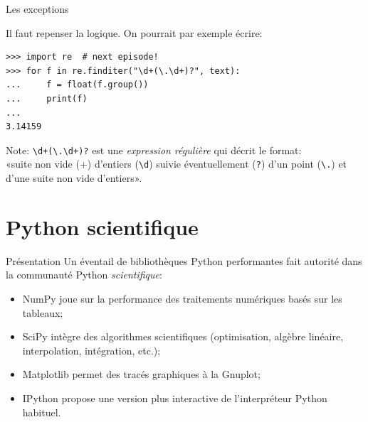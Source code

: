 \documentclass[dvipsnames]{beamer}
\begin{document}
\begin{frame} [fragile]{Les exceptions}

    Il faut repenser la logique. On pourrait par exemple écrire:

    \begin{verbatim}
>>> import re  # next episode!
>>> for f in re.finditer("\d+(\.\d+)?", text):
...     f = float(f.group())
...     print(f)
...
3.14159
\end{verbatim}
    {\footnotesize
    Note: \verb|\d+(\.\d+)?| est une \emph{expression régulière} qui décrit
    le format:\\ «suite non vide (+) d'entiers (\verb+\d+) suivie éventuellement
    (\verb+?+) d'un point (\verb+\.+) et d'une suite non vide d'entiers».
    }
\end{frame}

\section{Python scientifique}

\begin{frame}
    [fragile]{Présentation}
    Un éventail de bibliothèques Python performantes fait autorité dans la
    communauté Python \emph{scientifique}:

    \begin{itemize}
        \item \alert{NumPy} joue sur la performance des traitements numériques
              basés sur les tableaux;
        \item \alert{SciPy} intègre des algorithmes scientifiques (optimisation,
              algèbre linéaire, interpolation, intégration, etc.);
        \item \alert{Matplotlib} permet des tracés graphiques à la Gnuplot;
        \item \alert{IPython} propose une version plus interactive de
              l'interpréteur Python habituel.
    \end{itemize}
\end{frame}

\end{document}
